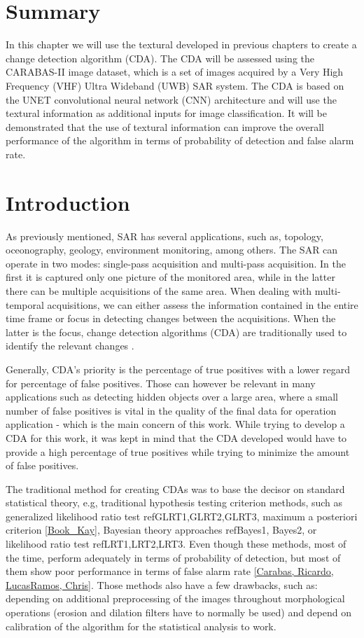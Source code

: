 \section{Summary}
In this chapter we will use the textural developed in previous chapters 
to create a change detection algorithm (CDA). The CDA will be assessed
using the CARABAS-II image dataset, which is a set of images acquired by a Very High Frequency (VHF) Ultra Wideband (UWB) SAR system.
The CDA is based on the UNET convolutional neural network (CNN) architecture and will use the 
textural information as additional inputs for image classification.
It will be demonstrated that the 
use of textural information can improve the overall performance of the algorithm
in terms of probability of detection and false alarm rate. 

\section{Introduction}
As previously mentioned, SAR has several applications, such as, topology, oceonography, geology, environment monitoring, among others.
The SAR can operate in two modes: single-pass acquisition and multi-pass acquisition. In the first it is captured only one picture of the 
monitored area, while in the latter there can be multiple acquisitions of the same area. 
When dealing with multi-temporal acquisitions, we can either assess the information contained in the entire time frame or focus in detecting changes between the acquisitions. 
When the latter is the focus, change detection algorithms (CDA) are traditionally used to identify the relevant changes \cite{Carabas, Ricardo}.

Generally, CDA's priority is the percentage of true positives with a lower regard for percentage of false positives. 
Those can however be relevant in many applications such as detecting hidden objects over a large area, 
where a small number of false positives is vital in the quality of the final data for operation application - which is the main concern of this work. 
While trying to develop a CDA for this work, it was kept in mind that the CDA developed would have to provide a high percentage of true positives while trying to minimize
the amount of false positives.

The traditional method for creating CDAs was to base the decisor on standard statistical theory, e.g, traditional hypothesis testing criterion methods,
such as 
generalized likelihood ratio test ref{GLRT1,GLRT2,GLRT3}, 
maximum a posteriori criterion \ref{Book_Kay},
Bayesian theory approaches ref{Bayes1, Bayes2},
or likelihood ratio test ref{LRT1,LRT2,LRT3}. Even though these methods, most of the time, perform adequately in terms of probability of detection, but
most of them show poor performance in terms of false alarm rate \ref{Carabas, Ricardo, LucasRamos, Chris}. Those methods also have a few drawbacks, such as: depending on
additional preprocessing of the images throughout morphological operations (erosion and dilation filters have to normally be used) and depend on calibration of the algorithm
for the statistical analysis to work.

